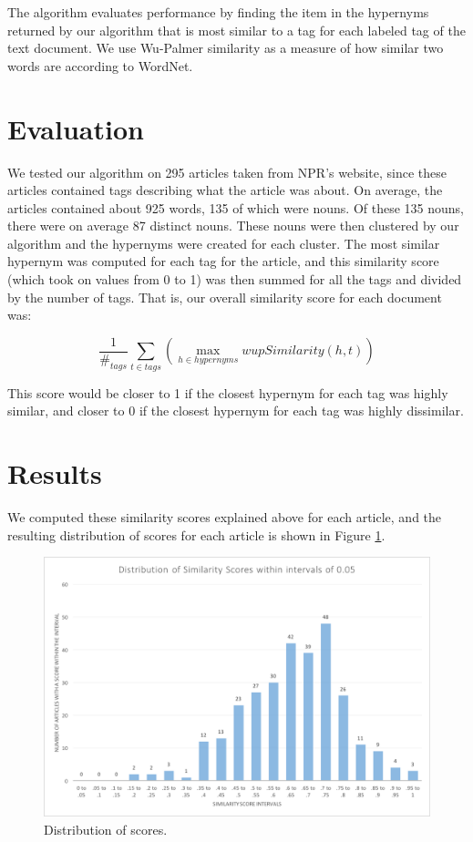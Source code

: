 \documentclass[12pt]{article}
\begin{document}
The algorithm evaluates performance by finding the item in the hypernyms returned by our algorithm that is most similar to a tag for each labeled tag of the text document. We use Wu-Palmer similarity as a measure of how similar two words are according to WordNet.

\section{Evaluation}

We tested our algorithm on 295 articles taken from NPR's website, since these articles contained tags describing what the article was about. On average, the articles contained about 925 words, 135 of which were nouns. Of these 135 nouns, there were on average 87 distinct nouns. These nouns were then clustered by our algorithm and the hypernyms were created for each cluster. The most similar hypernym was computed for each tag for the article, and this similarity score (which took on values from 0 to 1) was then summed for all the tags and divided by the number of tags. That is, our overall similarity score for each document was:

\[
 \frac{1}{\#_{tags}} \sum_{t \in tags}{(\max_{h \in hypernyms}{wupSimilarity(h, t)})}
\]

This score would be closer to 1 if the closest hypernym for each tag was highly similar, and closer to 0 if the closest hypernym for each tag was highly dissimilar.

\section{Results}

We computed these similarity scores explained above for each article, and the resulting distribution of scores for each article is shown in Figure \ref{scoreHist}.

\begin{figure}[t]
\centering
\includegraphics[width=\textwidth]{../scoreHist.png}
\caption{Distribution of scores.}
\label{scoreHist}
\end{figure}
\end{document}
